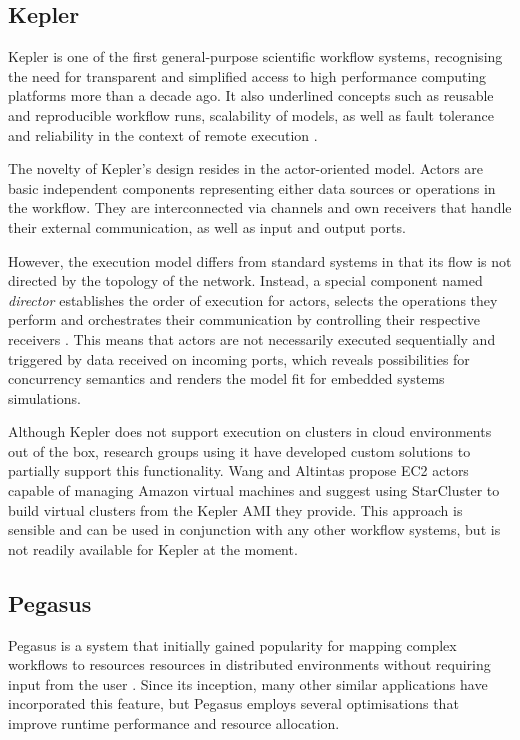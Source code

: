 \documentclass[11pt,a4paper]{report}
\begin{document}
\subsection{Kepler}

Kepler \cite{Kepler} is one of the first general-purpose scientific workflow systems, recognising the need for transparent and simplified access to high performance computing platforms more than a decade ago. It also underlined concepts such as reusable and reproducible workflow runs, scalability of models, as well as fault tolerance and reliability in the context of remote execution \cite{Ludascher2006}.

The novelty of Kepler's design resides in the actor-oriented model. Actors are basic independent components representing either data sources or operations in the workflow. They are interconnected via channels and own receivers that handle their external communication, as well as input and output ports.

However, the execution model differs from standard systems in that its flow is not directed by the topology of the network. Instead, a special component named \textit{director} establishes the order of execution for actors, selects the operations they perform and orchestrates their communication by controlling their respective receivers \cite{Curcin2008}. This means that actors are not necessarily executed sequentially and triggered by data received on incoming ports, which reveals possibilities for concurrency semantics and renders the model fit for embedded systems simulations.

Although Kepler does not support execution on clusters in cloud environments out of the box, research groups using it have developed custom solutions to partially support this functionality. Wang and Altintas \cite{Wang2012} propose EC2 actors capable of managing Amazon virtual machines and suggest using StarCluster \cite{StarCluster} to build virtual clusters from the Kepler AMI they provide. This approach is sensible and can be used in conjunction with any other workflow systems, but is not readily available for Kepler at the moment.

\subsection{Pegasus}

Pegasus \cite{Pegasus} is a system that initially gained popularity for mapping complex workflows to resources resources in distributed environments without requiring input from the user \cite{Deelman2004}. Since its inception, many other similar applications have incorporated this feature, but Pegasus employs several optimisations that improve runtime performance and resource allocation.
\end{document}
